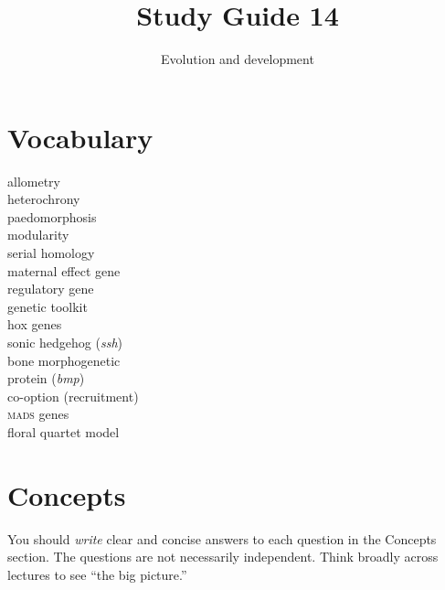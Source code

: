 \documentclass[letterpaper]{tufte-handout}
\title{Study Guide 14\hfill}
\author{Evolution and development}
\date{} %
\begin{document}
\maketitle	%

\section{Vocabulary}

\begin{multicols}{2}
allometry \\
heterochrony \\
paedomorphosis \\
modularity \\
serial homology\\
maternal effect gene \\
regulatory gene \\
genetic toolkit \\
hox genes\\
sonic hedgehog (\textit{ssh})\\
bone morphogenetic\\\hspace{1em}protein (\textit{bmp})\\
co-option (recruitment) \\
\textsc{mads} genes \\
floral quartet model
\end{multicols}


\section{Concepts}

You should \emph{write} clear and concise answers to each question in the Concepts section.  The questions are not necessarily independent.  Think broadly across lectures to see ``the big picture.'' 
\end{document}
